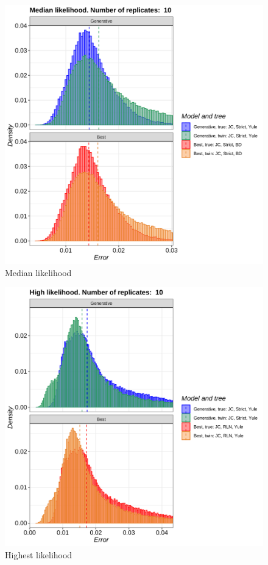 \begin{figure}[H]
  \includegraphics[width=\textwidth]{pirouette_example_23/errors_mid.png}
  \caption{Median likelihood}
\end{figure}

\begin{figure}[H]
  \includegraphics[width=\textwidth]{pirouette_example_23/errors_high.png}
  \caption{Highest likelihood}
\end{figure}

